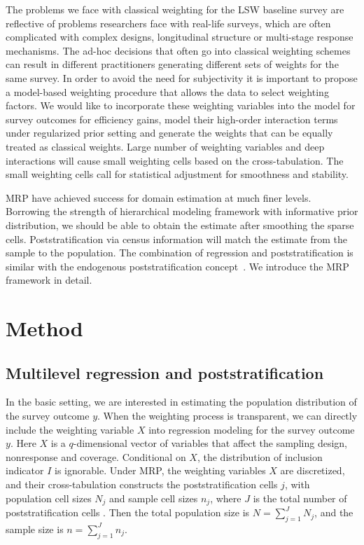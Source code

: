 \documentclass[11pt]{article}
\numberwithin{figure}{section}
\numberwithin{table}{section}
\numberwithin{equation}{section}
\begin{document}
The problems we face with classical weighting for the LSW baseline survey are
reflective of problems researchers face with real-life surveys, which are often
complicated with complex designs, longitudinal structure or multi-stage
response mechanisms. The ad-hoc decisions that often go into classical
weighting schemes can result in different practitioners generating different
sets of weights for the same survey. In order to avoid the need for
subjectivity it is important to propose a model-based weighting procedure that
allows the data to select weighting factors. We would like to incorporate these
weighting variables into the model for survey outcomes for efficiency gains,
model their high-order interaction terms under regularized prior setting and
generate the weights that can be equally treated as classical weights. Large
number of weighting variables and deep interactions will cause small weighting
cells based on the cross-tabulation. The small weighting cells call for
statistical adjustment for smoothness and stability. 
		
MRP have achieved success for domain estimation at much finer levels. Borrowing
the strength of hierarchical modeling framework with informative prior
distribution, we should be able to obtain the estimate after smoothing the
sparse cells. Poststratification via census information will match the estimate
from the sample to the population. The combination of regression and
poststratification is similar with the endogenous poststratification
concept~\citep{Breidt08,Dahlke13}. We introduce the MRP framework in detail.
	

\section{Method} \label{method}

\subsection{Multilevel regression and poststratification} In the basic setting,
we are interested in estimating the population distribution of the survey
outcome $y$. When the weighting process is transparent, we can directly include
the weighting variable $X$ into regression modeling for the survey outcome $y$.
Here $X$ is a $q$-dimensional vector of variables that affect the sampling
design, nonresponse and coverage.  Conditional on $X$, the distribution of
inclusion indicator $I$ is ignorable.  Under MRP, the weighting variables $X$
are discretized, and their cross-tabulation constructs the poststratification
cells $j$, with population cell sizes $N_j$ and sample cell sizes $n_j$, where
$J$ is the total number of poststratification cells \citep{little91, little93,
gelman:little:97,gelmancarlin01}. Then the total population size is
$N=\sum_{j=1}^J N_j$, and the sample size is $n=\sum_{j=1}^Jn_j$. 
\end{document}
